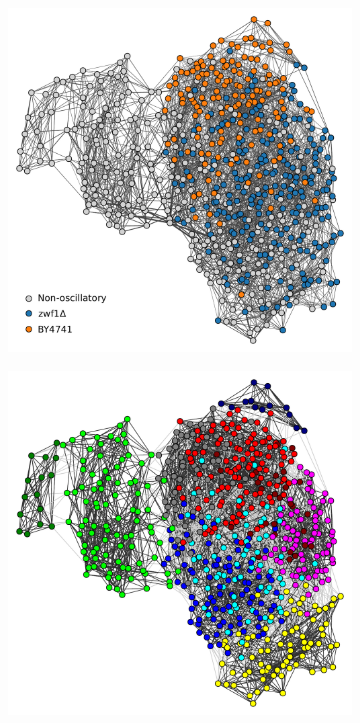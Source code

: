 \begin{figure}[htbp]
  \centering
  \begin{subfigure}[t]{0.5\textwidth}
  \centering
    \includegraphics[width=\linewidth]{graphclust_combined_is20016_edit1.pdf}
    \caption{
    }
    \label{fig:graphclustering-combined}
  \end{subfigure}

  \begin{subfigure}[t]{0.5\textwidth}
  \centering
    \includegraphics[width=\linewidth]{graphclust_leiden_is20016.pdf}
    \caption{
    }
    \label{fig:graphclustering-leiden}
  \end{subfigure}


\end{figure}
